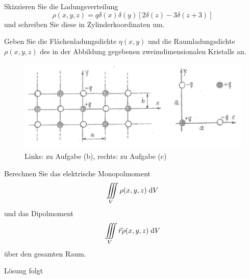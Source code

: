 \documentclass{atistandalonetask}
\begin{document}
  \begin{atiTask}[
    title = Ionenkristalle
  ]
    \begin{atiSubtasks}
    	\item Skizzieren Sie die Ladungsverteilung 
    	\[
    	\rho(x,y,z)=q\delta(x)\delta(y)[2\delta(z)-3\delta(z+3)]
    	\]
    	und schreiben Sie diese in Zylinderkoordinaten um. 
    	\item Geben Sie die Flächenladungsdichte $\eta(x,y)$ und die Raumladungsdichte $\rho(x,y,z)$ des in der Abbildung gegebenen zweimdimensionalen Kristalls an.
    	\begin{figure}
		\centering
		\includegraphics[width=0.7\linewidth]{./picture-delta_v}
		\caption{Links: zu Aufgabe (b), rechts: zu Aufgabe (c)}
		\end{figure}
    	\item Berechnen Sie das elektrische Monopolmoment
    	\[
    	\iiint\limits_V\rho(x,y,z)\;\mathrm{d} V
    	\]
    	und das Dipolmoment
    	\[
    	\iiint\limits_V\vec{r}\rho(x,y,z)\;\mathrm{d} V
    	\]
    	über den gesamten Raum.
    \end{atiSubtasks}	
  \end{atiTask}
  \begin{atiSolution}
   	Lösung folgt
  \end{atiSolution}
\end{document}
